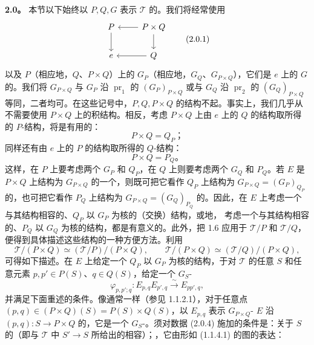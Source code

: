 \textbf{2.0。} 本节以下始终以 $P,Q,G$ 表示 $\mathcal T$ 的。我们将经常使用
\[
\begin{tikzcd}
P\arrow[d]&P\times Q\arrow[l]\arrow[d]\\
e&Q\arrow[l]
\end{tikzcd}
\tag{2.0.1}
\]
以及 $P$（相应地，$Q$、$P\times Q$）上的 $G_P$（相应地，$G_Q$、$G_{P\times Q}$），它们是 $e$ 上的 $G$ 的。我们将 $G_{P\times Q}$ 与 $G_P$ 沿 $\operatorname{pr}_1$ 的 $(G_P)_{P\times Q}$ 或与 $G_Q$ 沿 $\operatorname{pr}_2$ 的 $(G_Q)_{P\times Q}$ 等同，二者均可。在这些记号中，$P,Q,P\times Q$ 的结构不起。事实上，我们几乎从不需要使用 $P\times Q$ 上的积结构。相反，考虑 $P\times Q$ 上由 $e$ 上的 $Q$ 的结构取所得的 $P$-结构，将是有用的：
\[
P\times Q=Q_P；\tag{2.0.2}
\]
同样还有由 $e$ 上的 $P$ 的结构取所得的 $Q$-结构：
\[
P\times Q=P_Q。\tag{2.0.3}
\]
这样，在 $P$ 上要考虑两个 $G_P$ 和 $Q_P$，在 $Q$ 上则要考虑两个 $G_Q$ 和 $P_Q$。若 $E$ 是 $P\times Q$ 上结构为 $G_{P\times Q}$ 的一个，则既可把它看作 $Q_P$ 上结构为 $G_{P\times Q}=(G_P)_{Q_P}$ 的，也可把它看作 $P_Q$ 上结构为 $G_{P\times Q}=(G_Q)_{P_Q}$ 的。因此，在 $E$ 上考虑一个与其结构相容的、$Q_P$ 以 $G_P$ 为核的（交换）结构，或地，
考虑一个与其结构相容的、$P_Q$ 以 $G_Q$ 为核的结构，都是有意义的。此外，把 1.6 应用于 $\mathcal T/P$ 和 $\mathcal T/Q$，便得到具体描述这些结构的一种方便方法。利用
\[
\mathcal T/(P\times Q)\simeq(\mathcal T/P)/(P\times Q),\qquad
\mathcal T/(P\times Q)\simeq(\mathcal T/Q)/(P\times Q),
\]
可得如下描述。在 $E$ 上给定一个 $Q_P$ 以 $G_P$ 为核的结构，于对 $\mathcal T$ 的任意 $S$ 和任意元素 $p,p'\in P(S)$、$q\in Q(S)$，给定一个 $G_S$-
\[
\varphi_{p,p';q}:E_{p,q}E_{p',q}\xrightarrow{\sim}E_{pp',q},\tag{2.0.4}
\]
并满足下面重述的条件。像通常一样（参见 1.1.2.1），对于任意点 $(p,q)\in(P\times Q)(S)=P(S)\times Q(S)$，以 $E_{p,q}$ 表示 $G_{P\times Q}$- $E$ 沿 $(p,q):S\to P\times Q$ 的，它是一个 $G_S$-。须对数据 (2.0.4) 施加的条件是：关于 $S$ 的（即与 $\mathcal T$ 中 $S'\to S$ 所给出的相容）；，它由形如 (1.1.4.1) 的图的表达：
